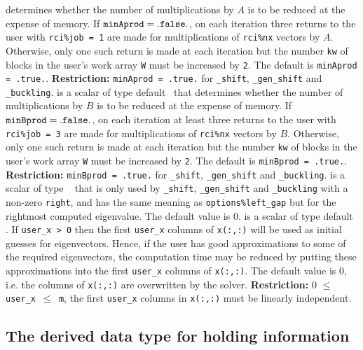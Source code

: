 \begin{description}
determines whether the number of multiplications by $A$ 
is to be reduced at the expense of memory. 
If ${\tt minAprod = .false.}$, 
on each iteration three returns to the user
with {\tt rci\%job = 1} are
made for multiplications of {\tt rci\%nx} vectors by $A$.
Otherwise,  only one such return is made at each iteration but 
the number {\tt kw} of blocks in the user's work array {\tt W} 
must be increased by {\tt 2}.
The default is {\tt minAprod = .true.}.
{\bf Restriction:} {\tt minAprod = .true.} %
for {\tt\solver\_shift}, {\tt\solver\_gen\_shift}
and  {\tt\solver\_buckling}.
%
 is a scalar of type default \Logical\ that
determines whether the number of multiplications by $B$ 
is to be reduced at the expense of memory. 
If ${\tt minBprod = .false.}$, 
on each iteration at least three returns to the user
with {\tt rci\%job = 3} are
made for multiplications of {\tt rci\%nx} vectors by $B$.
Otherwise,  only one such return is made at each iteration but 
the number {\tt kw} of blocks in the user's work array {\tt W} 
must be increased by {\tt 2}.
The default is {\tt minBprod = .true.}.
{\bf Restriction:} {\tt minBprod = .true.} %
for {\tt\solver\_shift}, {\tt\solver\_gen\_shift}
and  {\tt\solver\_buckling}.
%
is a scalar of type \REALDP\ %
that is only used by 
{\tt \solver\_shift}, {\tt \solver\_gen\_shift}
and {\tt \solver\_buckling}
with a non-zero {\tt right}, and
has the same meaning as {\tt options\%left\_gap}
but for the rightmost computed eigenvalue.
The default value is 0.
%
 is a scalar of type default \Integer. 
If {\tt user\_x > 0} then the first {\tt user\_x} columns
of {\tt x(:,:)} will be used as initial guesses for eigenvectors.
Hence, if the user has good approximations
to some of the required eigenvectors, the computation time
may be reduced by putting these approximations
into the first {\tt user\_x} columns of {\tt x(:,:)}.
The default value is 0, 
i.e. the columns of {\tt x(:,:)} are overwritten by the solver.
{\bf Restriction:} {0 $\le$ \tt user\_x $\le$ m},
the first {\tt user\_x} columns in {\tt x(:,:)}
must be linearly independent.
%
\end{description}

\subsection{The derived data type for holding information}

\label{sec:inform}

